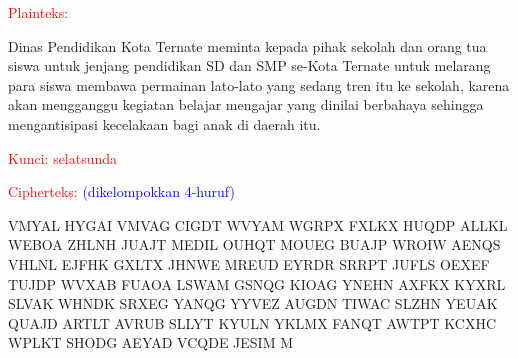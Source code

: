 \documentclass{article}
\begin{document}

\textcolor{red}{Plainteks:} \begin{minipage}{0.75\textwidth}
Dinas Pendidikan Kota Ternate meminta kepada pihak sekolah dan orang tua siswa untuk jenjang pendidikan SD dan SMP se-Kota Ternate untuk melarang para siswa membawa permainan lato-lato yang sedang tren itu ke sekolah, karena akan mengganggu kegiatan belajar mengajar yang dinilai berbahaya sehingga mengantisipasi kecelakaan bagi anak di daerah itu.
\end{minipage}

\vspace{5mm}

\textcolor{red}{Kunci:} \textcolor{red}{selatsunda}

\vspace{5mm}

\textcolor{red}{Cipherteks:}
\textcolor{blue}{(dikelompokkan 4-huruf)} \begin{minipage}{0.75\textwidth}
VMYAL HYGAI VMVAG CIGDT WVYAM WGRPX FXLKX HUQDP ALLKL WEBOA
ZHLNH JUAJT MEDIL OUHQT MOUEG BUAJP WROIW AENQS VHLNL EJFHK
GXLTX JHNWE MREUD EYRDR SRRPT JUFLS OEXEF TUJDP WVXAB FUAOA
LSWAM GSNQG KIOAG YNEHN AXFKX KYXRL SLVAK WHNDK SRXEG YANQG
YYVEZ AUGDN TIWAC SLZHN YEUAK QUAJD ARTLT AVRUB SLLYT KYULN YKLMX
FANQT AWTPT KCXHC WPLKT SHODG AEYAD VCQDE JESIM M
\end{minipage}
\end{document}
